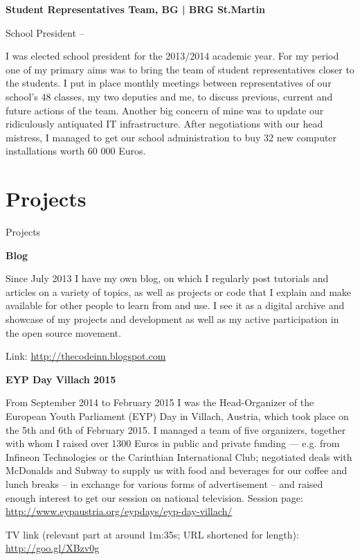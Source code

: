 \begin{body}
\textbf{Student Representatives Team, BG | BRG St.Martin}

School President \hfill {} -- 

\begin{detail}
I was elected school president for the 2013/2014 academic year. For my period one of my primary aims was to bring the team of student representatives closer to the students. I put in place monthly meetings between representatives of our school's 48 classes, my two deputies and me, to discuss previous, current and future actions of the team. Another big concern of mine was to update our ridiculously antiquated IT infrastructure. After negotiations with our head mistress, I managed to get our school administration to buy 32 new computer installations worth 60 000 Euros.
\end{detail}


\section{Projects}
{Projects}

\textbf{Blog}

\begin{detail}
Since July 2013 I have my own blog, on which I regularly post tutorials and articles on a variety of topics, as well as projects or code that I explain and make available for other people to learn from and use. I see it as a digital archive and showcase of my projects and development as well as my active participation in the open source movement.

Link: \href{http://thecodeinn.blogspot.com}{http://thecodeinn.blogspot.com}
\end{detail}

\textbf{EYP Day Villach 2015}

\begin{detail}
From September 2014 to February 2015 I was the Head-Organizer of the European Youth Parliament (EYP) Day in Villach, Austria, which took place on the 5th and 6th of February 2015. I managed a team of five organizers, together with whom I raised over 1300 Euros in public and private funding --- e.g. from Infineon Technologies or the Carinthian International Club; negotiated deals with McDonalds and Subway to supply us with food and beverages for our coffee and lunch breaks -- in exchange for various forms of advertisement -- and raised enough interest to get our session on national television.
Session page: \href{http://www.eypaustria.org/eypdays/eyp-day-villach/}{http://www.eypaustria.org/eypdays/eyp-day-villach/}
\par
TV link (relevant part at around 1m:35s; URL shortened for length): \href{http://goo.gl/XBzv0g}{http://goo.gl/XBzv0g}
\end{detail}


\end{body}

